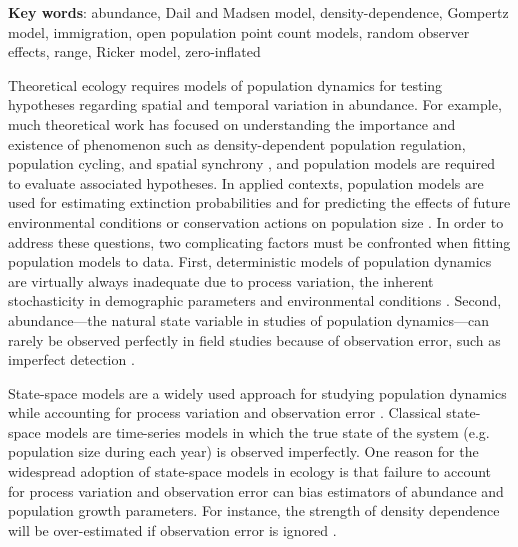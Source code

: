 \documentclass[12pt]{article}
\begin{document}
\vspace{0.5cm}

\textbf{Key words}: abundance, Dail and Madsen model, density-dependence,
Gompertz model, immigration, open population point count models,
random observer effects, range, Ricker model, zero-inflated

\newpage

Theoretical ecology requires models of population dynamics for testing
hypotheses regarding spatial and temporal variation in
abundance. For example, much theoretical work has focused on
understanding the importance and existence of phenomenon such as
density-dependent population regulation, population cycling, and spatial synchrony
\citep{may:1975,royama:1977,turchin:1990,dennis_taper:1994,bjornstad_etal:1999},
and population models are required to evaluate associated hypotheses.
In applied contexts, population models are used for
estimating extinction probabilities
\citep{schoener_spiller:1992,nadeem_lele:2011} and for predicting the
effects of future environmental conditions or conservation actions on
population size \citep{jamieson_brooks:2004,hatfield_etal:2012}.
In order to address these questions, two complicating factors must
be confronted when fitting population models to data.
First, deterministic models of population
dynamics are virtually always inadequate due to process variation,
the inherent stochasticity in demographic parameters and environmental
conditions \citep{bjornstad_grenfell:2001}. %
Second, abundance---the natural state variable in studies
of population dynamics---can rarely be observed perfectly in field
studies because of observation error, such as imperfect
detection \citep{link_nichols:1994,kery_etal:2009}.

State-space models are a widely used approach for
studying population dynamics while accounting for process variation
and observation error \citep{devalpine_hastings:2002,
  buckland_etal:2004, dennis_etal:2006}. Classical state-space
models are time-series models in which the true state of the
system (e.g. population size during each year) is observed
imperfectly. One reason for the widespread adoption of state-space
models in ecology is that failure to account for process variation and
observation error can bias estimators of abundance and population
growth parameters. For instance, the strength of
density dependence will be over-estimated if observation error is
ignored \citep{link_nichols:1994,shenk_etal:1998}.
\end{document}
